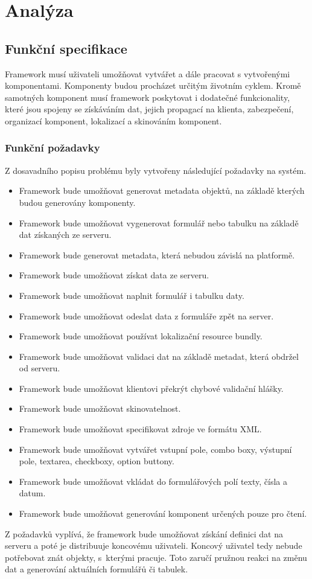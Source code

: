 \chapter{Analýza}
\section{Funkční specifikace}
Framework \cite{framework} musí uživateli umožňovat vytvářet a dále pracovat s vytvořenými komponentami. Komponenty budou procházet určitým životním cyklem. Kromě samotných komponent musí framework poskytovat i dodatečné funkcionality, které jsou spojeny se získáváním dat, jejich propagací na klienta, zabezpečení, organizací komponent, lokalizací a skinováním komponent.
\subsection{Funkční požadavky}
Z dosavadního popisu problému byly vytvořeny následující požadavky na systém.
\begin{itemize}
\item Framework bude umožňovat generovat metadata objektů, na základě kterých budou generovány komponenty.
\item Framework bude umožňovat vygenerovat formulář nebo tabulku na základě dat získaných ze serveru.
\item Framework bude generovat metadata, která nebudou závislá na platformě.
\item Framework bude umožňovat získat data ze serveru.
\item Framework bude umožňovat naplnit formulář i tabulku daty.
\item Framework bude umožňovat odeslat data z formuláře zpět na server.
\item Framework bude umožňovat používat lokalizační resource bundly.
\item Framework bude umožňovat validaci dat na základě metadat, která obdržel od serveru.
\item Framework bude umožňovat klientovi překrýt chybové validační hlášky.
\item Framework bude umožňovat skinovatelnost.
\item Framework bude umožňovat specifikovat zdroje ve formátu XML.
\item Framework bude umožňovat vytvářet vstupní pole, combo boxy, výstupní pole, textarea, checkboxy, option buttony.
\item Framework bude umožňovat vkládat do formulářových polí texty, čísla a datum.
\item Framework bude umožňovat generování komponent určených pouze pro čtení. 
\end{itemize} 
Z požadavků vyplívá, že framework bude umožňovat získání definici dat na serveru a poté je distribuuje koncovému uživateli. Koncový uživatel tedy nebude potřebovat znát objekty, s~kterými pracuje. Toto zaručí pružnou reakci na změnu dat a generování aktuálních formulářů či tabulek. 
